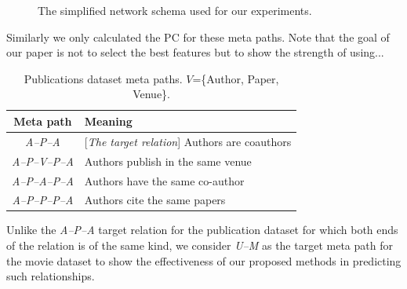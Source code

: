 \begin{figure}[t]
\centering
{}
\caption{The simplified network schema used for our experiments.} \label{Fig:expSchema}
\end{figure}


Similarly we only calculated the PC for these meta paths. Note that the goal of our paper is not to select the best features but to show the strength of using...


\begin{table}[h]
\centering
\caption{Publications dataset meta paths. $V$=\{Author, Paper, Venue\}.}
\label{table_publications}\scriptsize
\begin{tabular}{|c|l|} \hline
\textbf{Meta path} & \textbf{Meaning} \\ \hline

\textit{A--P--A} & [\textit{The target relation}] Authors are coauthors \\ \hline
\textit{A--P--V--P--A} & Authors publish in the same venue \\ \hline
\textit{A--P--A--P--A} & Authors have the same co-author \\ \hline
\textit{A--P--P--P--A} & Authors cite the same papers \\ \hline

\end{tabular}


\end{table}

Unlike the \textit{A--P--A} target relation for the publication dataset for which both ends of the relation is of the same kind, we consider \textit{U--M} as the target meta path for the movie dataset to show the effectiveness of our proposed methods in predicting such relationships.


